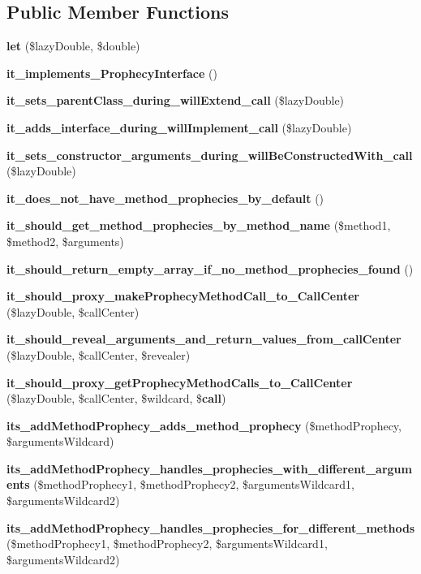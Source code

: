 \subsection*{Public Member Functions}
\begin{DoxyCompactItemize}
\item 
{\bf let} (\$lazy\+Double, \$double)
\item 
{\bf it\+\_\+implements\+\_\+\+Prophecy\+Interface} ()
\item 
{\bf it\+\_\+sets\+\_\+parent\+Class\+\_\+during\+\_\+will\+Extend\+\_\+call} (\$lazy\+Double)
\item 
{\bf it\+\_\+adds\+\_\+interface\+\_\+during\+\_\+will\+Implement\+\_\+call} (\$lazy\+Double)
\item 
{\bf it\+\_\+sets\+\_\+constructor\+\_\+arguments\+\_\+during\+\_\+will\+Be\+Constructed\+With\+\_\+call} (\$lazy\+Double)
\item 
{\bf it\+\_\+does\+\_\+not\+\_\+have\+\_\+method\+\_\+prophecies\+\_\+by\+\_\+default} ()
\item 
{\bf it\+\_\+should\+\_\+get\+\_\+method\+\_\+prophecies\+\_\+by\+\_\+method\+\_\+name} (\$method1, \$method2, \$arguments)
\item 
{\bf it\+\_\+should\+\_\+return\+\_\+empty\+\_\+array\+\_\+if\+\_\+no\+\_\+method\+\_\+prophecies\+\_\+found} ()
\item 
{\bf it\+\_\+should\+\_\+proxy\+\_\+make\+Prophecy\+Method\+Call\+\_\+to\+\_\+\+Call\+Center} (\$lazy\+Double, \$call\+Center)
\item 
{\bf it\+\_\+should\+\_\+reveal\+\_\+arguments\+\_\+and\+\_\+return\+\_\+values\+\_\+from\+\_\+call\+Center} (\$lazy\+Double, \$call\+Center, \$revealer)
\item 
{\bf it\+\_\+should\+\_\+proxy\+\_\+get\+Prophecy\+Method\+Calls\+\_\+to\+\_\+\+Call\+Center} (\$lazy\+Double, \$call\+Center, \$wildcard, \${\bf call})
\item 
{\bf its\+\_\+add\+Method\+Prophecy\+\_\+adds\+\_\+method\+\_\+prophecy} (\$method\+Prophecy, \$arguments\+Wildcard)
\item 
{\bf its\+\_\+add\+Method\+Prophecy\+\_\+handles\+\_\+prophecies\+\_\+with\+\_\+different\+\_\+arguments} (\$method\+Prophecy1, \$method\+Prophecy2, \$arguments\+Wildcard1, \$arguments\+Wildcard2)
\item 
{\bf its\+\_\+add\+Method\+Prophecy\+\_\+handles\+\_\+prophecies\+\_\+for\+\_\+different\+\_\+methods} (\$method\+Prophecy1, \$method\+Prophecy2, \$arguments\+Wildcard1, \$arguments\+Wildcard2)
\item 

\end{DoxyCompactItemize}
